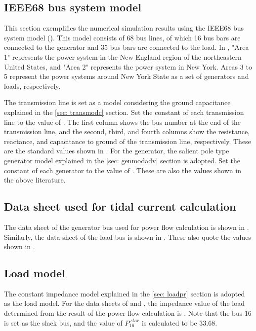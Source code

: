 \documentclass[tombow,dvipdfmx]{corona-a5-1.1}
\begin{document}
\subsection{IEEE68 bus system model}

This section exemplifies the numerical simulation results using the IEEE68 bus system model ().
This model consists of 68 bus lines, of which 16 bus bars are connected to the generator and 35 bus bars are connected to the load.
In , "Area 1" represents the power system in the New England region of the northeastern United States, and "Area 2" represents the power system in New York.
Areas 3 to 5 represent the power systems around New York State as a set of generators and loads, respectively.

The transmission line is set as a model considering the ground capacitance explained in the \ref{sec: transmodc} section.
Set the constant of each transmission line to the value of .
The first column shows the bus number at the end of the transmission line, and the second, third, and fourth columns show the resistance, reactance, and capacitance to ground of the transmission line, respectively.
These are the standard values shown in \cite[Appendix A]{pal2006robust}.
For the generator, the salient pole type generator model explained in the \ref{sec: genmodadv} section is adopted.
Set the constant of each generator to the value of .
These are also the values shown in the above literature.

\subsection{Data sheet used for tidal current calculation}


The data sheet of the generator bus used for power flow calculation is shown in .
Similarly, the data sheet of the load bus is shown in .
These also quote the values shown in \cite[Appendix A]{pal2006robust}.


\subsection{Load model}

The constant impedance model explained in the \ref{sec: loadpr} section is adopted as the load model.
For the data sheets of  and , the impedance value of the load determined from the result of the power flow calculation is .
Note that the bus 16 is set as the slack bus, and the value of $ P_ {16} ^ {\ star} $ is calculated to be 33.68.
\end{document}
